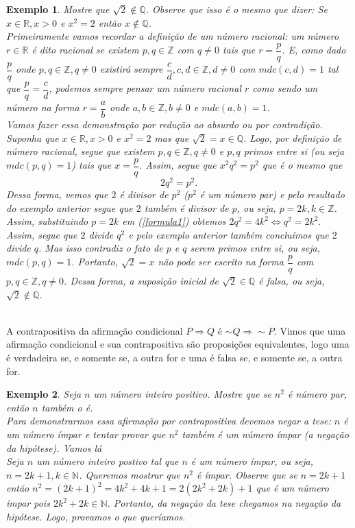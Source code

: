 \documentclass[10pt]{article}
\newtheorem{exemplo}{Exemplo}
\begin{document}
\begin{exemplo}
Mostre que $\sqrt{2}\not\in \mathbb{Q}$. Observe que isso é o mesmo que dizer: Se $x\in \mathbb{R}, x>0$ e $x^2=2$ então $x\not\in \mathbb{Q}$.\\
\noindent Primeiramente vamos recordar a definição de um número racional: um número $r\in \mathbb{R}$ é dito racional se existem $p, q\in \mathbb{Z}$ com $q\neq 0$ tais que $r=\dfrac{p}{q}$. E, como dado $\dfrac{p}{q}$ onde $p, q \in \mathbb{Z}, q\neq 0$ existirá sempre $\dfrac{c}{d}, c, d \in \mathbb{Z}, d\neq 0$ com $mdc(c,d)=1$ tal que $\dfrac{p}{q}=\dfrac{c}{d}$, podemos sempre pensar um número racional $r$ como sendo um número na forma $r=\dfrac{a}{b}$ onde $a,b\in \mathbb{Z}, b\neq 0$ e $mdc(a,b)=1$.\\
Vamos fazer essa demonstração por redução ao absurdo ou por contradição. Suponha que  $x\in \mathbb{R}, x>0$ e $x^2=2$ mas que $\sqrt{2}= x\in \mathbb{Q}$. Logo, por definição de número racional, segue que existem $p, q\in \mathbb{Z}, q\neq 0$ e $p,q$ primos entre si (ou seja $mdc(p,q)=1$) tais que $x=\dfrac{p}{q}$. Assim, segue que $x^2q^2=p^2$ que é o mesmo que \begin{equation}\label{formula1}2q^2=p^2.\end{equation} Dessa forma, vemos que $2$ é divisor de $p^2$ ($p^2$ é um número par) e pelo resultado do exemplo anterior segue que $2$ também é divisor de $p$, ou seja, $p=2k, k\in \mathbb{Z}$. Assim, substituindo $p=2k$ em (\ref{formula1}) obtemos $2q^2=4k^2\Leftrightarrow q^2=2k^2.$ Assim, segue que $2$ divide $q^2$ e pelo exemplo anterior também concluímos que $2$ divide $q$. Mas isso contradiz o fato de $p$ e $q$ serem primos entre si, ou seja, $mdc(p,q)=1$. Portanto, $\sqrt{2}=x$ não pode ser escrito na forma $\dfrac{p}{q}$ com $p,q\in \mathbb{Z}, q\neq 0$. Dessa forma, a suposição inicial de $\sqrt{2}\in \mathbb{Q}$ é falsa, ou seja, $\sqrt{2}\not\in \mathbb{Q}$.
\end{exemplo}
\\
A contrapositiva da afirmação condicional $P\Rightarrow Q$ é $\sim Q\Rightarrow \sim P$. Vimos que uma afirmação condicional e sua contrapositiva são proposições equivalentes, logo uma é verdadeira se, e somente se, a outra for e uma é falsa se, e somente se, a outra for.
\begin{exemplo}Seja $n$ um número inteiro positivo. Mostre que se $n^2$ é número par, então $n$ também o é.\\
Para demonstrarmos essa afirmação por contrapositiva devemos negar a tese:  $n$ é um número ímpar e tentar provar que $n^2$ também é um número ímpar (a negação da hipótese). Vamos lá\\
Seja $n$ um número inteiro postivo tal que $n$ é um número ímpar, ou seja, $n=2k+1,k\in \mathbb{N}$. Queremos mostrar que $n^2$ é ímpar. Observe que se $n=2k+1$ então $n^2=(2k+1)^2=4k^2+4k+1=2(2k^2+2k)+1$ que é um número ímpar pois $2k^2+2k\in \mathbb{N}$. Portanto,  da negação da tese chegamos na negação da hipótese. Logo, provamos o que queríamos.
\end{exemplo}
\end{document}
